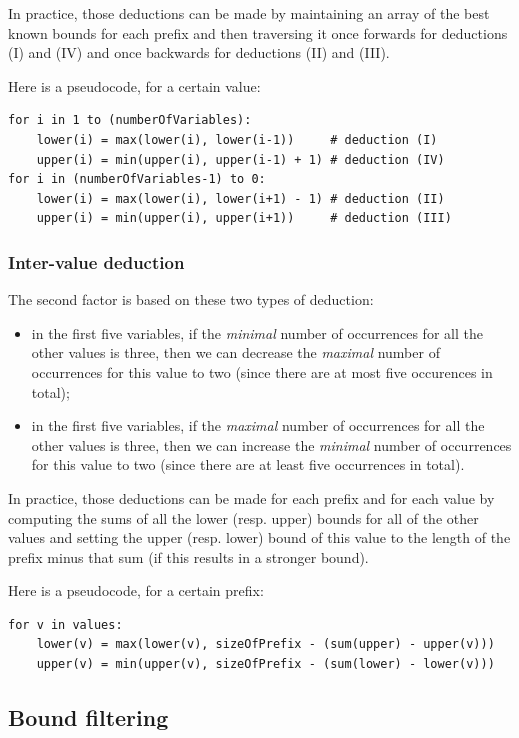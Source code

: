 \documentclass[a4paper,10pt]{article}
\begin{document}
In practice, those deductions can be made by maintaining an array of the best known bounds for each prefix and then traversing it once forwards for deductions (I) and (IV) and once backwards for deductions (II) and (III).

Here is a pseudocode, for a certain value:
\begin{lstlisting}
for i in 1 to (numberOfVariables):
    lower(i) = max(lower(i), lower(i-1))     # deduction (I)
    upper(i) = min(upper(i), upper(i-1) + 1) # deduction (IV)
for i in (numberOfVariables-1) to 0:
    lower(i) = max(lower(i), lower(i+1) - 1) # deduction (II)
    upper(i) = min(upper(i), upper(i+1))     # deduction (III)
\end{lstlisting}

\subsubsection{Inter-value deduction}

The second factor is based on these two types of deduction:
\begin{itemize}
    \item in the first five variables, if the \emph{minimal} number of occurrences for all the other values is three, then we can decrease the \emph{maximal} number of occurrences for this value to two (since there are at most five occurences in total);
    \item in the first five variables, if the \emph{maximal} number of occurrences for all the other values is three, then we can increase the \emph{minimal} number of occurrences for this value to two (since there are at least five occurrences in total).
\end{itemize}

In practice, those deductions can be made for each prefix and for each value by computing the sums of all the lower (resp. upper) bounds for all of the other values and setting the upper (resp. lower) bound of this value to the length of the prefix minus that sum (if this results in a stronger bound).

Here is a pseudocode, for a certain prefix:
\begin{lstlisting}
for v in values:
    lower(v) = max(lower(v), sizeOfPrefix - (sum(upper) - upper(v)))
    upper(v) = min(upper(v), sizeOfPrefix - (sum(lower) - lower(v)))
\end{lstlisting}

\subsection{Bound filtering}
\label{subsec:filtering}
\end{document}
